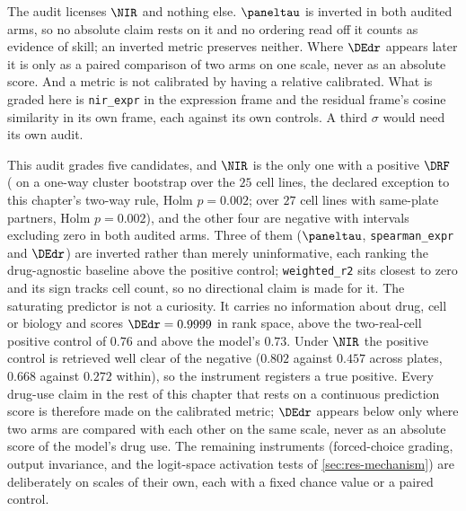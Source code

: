 \begin{scopelimit}
The audit licenses $\NIR$ and nothing else. $\paneltau$ is inverted in both
audited arms, so no absolute claim rests on it and no ordering read off it counts
as evidence of skill; an inverted metric preserves neither. Where $\DEdr$
appears later it is only as a paired comparison of two arms on one scale, never
as an absolute score. And a metric is not calibrated by having a relative
calibrated. What is graded here is \texttt{nir\_expr} in the expression frame and
the residual frame's cosine similarity in its own frame, each against its own
controls. A third $\sigma$ would need its own audit.
\end{scopelimit}

\begin{claim}
This audit grades five candidates, and $\NIR$ is the only
one with a positive $\DRF$ ( on a one-way cluster
bootstrap over the $25$ cell lines, the declared exception to this chapter's
two-way rule, Holm $p = 0.002$;  over $27$ cell lines
with same-plate partners, Holm $p = 0.002$), and the other four are negative with
intervals excluding zero in both audited arms. Three of them ($\paneltau$,
\texttt{spearman\_expr} and $\DEdr$) are inverted rather than merely
uninformative, each ranking the drug-agnostic baseline above the positive
control; \texttt{weighted\_r2} sits closest to zero and its sign tracks cell
count, so no directional claim is made for it. The saturating predictor is not a
curiosity. It carries no information about drug, cell or biology and scores
$\DEdr = 0.9999$ in rank space, above the two-real-cell positive control of
$0.76$ and above the model's $0.73$. Under $\NIR$ the positive control is retrieved well clear of
the negative ($0.802$ against $0.457$ across plates, $0.668$ against $0.272$
within), so the instrument registers a true positive. Every drug-use claim in
the rest of this chapter that rests on a continuous prediction score is
therefore made on the calibrated metric; $\DEdr$ appears below only where two
arms are compared with each other on the same scale, never as an absolute score
of the model's drug use. The remaining instruments (forced-choice grading,
output invariance, and the logit-space activation tests of
\cref{sec:res-mechanism}) are deliberately on scales of their own, each with a
fixed chance value or a paired control.
\end{claim}

